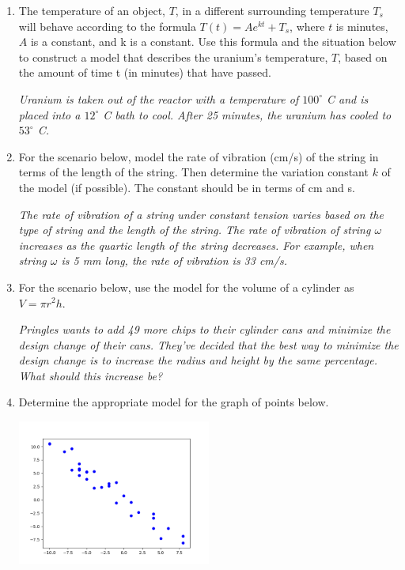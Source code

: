 \documentclass[14pt]{extbook}
\begin{document}
\begin{enumerate}
\item{
The temperature of an object, $T$, in a different surrounding temperature $T_s$ will behave according to the formula $T(t) = Ae^{kt} + T_s$, where $t$ is minutes, $A$ is a constant, and k is a constant. Use this formula and the situation below to construct a model that describes the uranium's temperature, $T$, based on the amount of time t (in minutes) that have passed.
\begin{center}
    \textit{ Uranium is taken out of the reactor with a temperature of $100^{\circ}$ C and is placed into a $12^{\circ}$ C bath to cool. After 25 minutes, the uranium has cooled to $53^{\circ}$ C. }
\end{center}
} \newpage
\item{
For the scenario below, model the rate of vibration (cm/s) of the string in terms of the length of the string. Then determine the variation constant $k$ of the model (if possible). The constant should be in terms of cm and s.
\begin{center}
    \textit{ The rate of vibration of a string under constant tension varies based on the type of string and the length of the string. The rate of vibration of string $\omega$ increases as the quartic length of the string decreases. For example, when string $\omega$ is 5 mm long, the rate of vibration is 33 cm/s. }
\end{center}
} \newpage
\item{
For the scenario below, use the model for the volume of a cylinder as $V = \pi r^2 h$.
\begin{center}
    \textit{ Pringles wants to add 49  more chips to their cylinder cans and minimize the design change of their cans. They've decided that the best way to minimize the design change is to increase the radius and height by the same percentage. What should this increase be? }
\end{center}
} \newpage
\item{
Determine the appropriate model for the graph of points below.
\begin{center}
    \includegraphics[width=0.5\textwidth]{../Figures/identifyModelGraph12CopyB.png}

\end{center}}
\end{enumerate}
\end{document}
